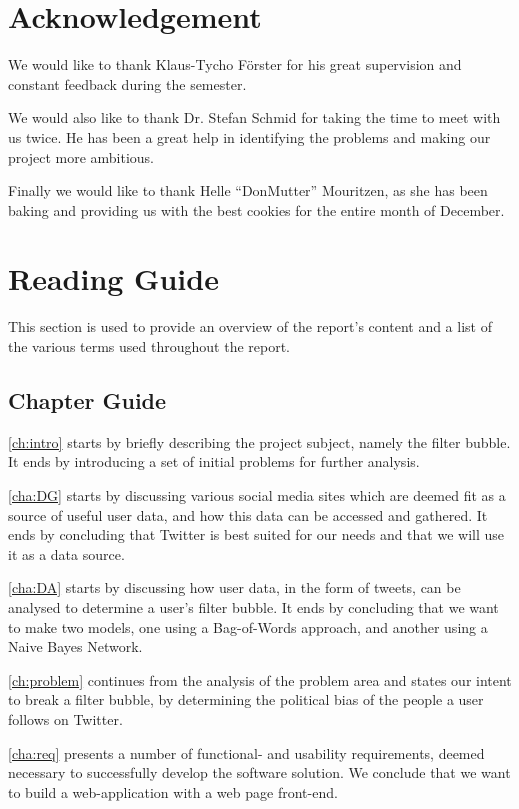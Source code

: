 \section*{Acknowledgement}
We would like to thank Klaus-Tycho Förster for his great supervision
and constant feedback during the semester.\nl

We would also like to thank Dr. Stefan Schmid for taking the time to meet with
us twice. He has been a great help in identifying the problems and making our
project more ambitious.\nl

Finally we would like to thank Helle ``DonMutter'' Mouritzen, as she has been
baking and providing us with the best cookies for the entire month of
December.\newpage


\section{Reading Guide}\label{sec:readingGuide}
This section is used to provide an overview of the report's content and a list
of the various terms used throughout the report.

\subsection{Chapter Guide}
\autoref{ch:intro} starts by briefly describing the project subject, namely  the
filter bubble. It ends by introducing a set of initial problems for further
analysis.\nl

\autoref{cha:DG} starts by discussing various social media sites which are
deemed fit as a source of useful user data, and how this data can be
accessed and gathered. It ends by concluding that Twitter is best suited for our
needs and that we will use it as a data source.\nl

\autoref{cha:DA} starts by discussing how user data, in the form of tweets, can
be analysed to determine a user's filter bubble. It ends by concluding
that we want to make two models, one using a Bag-of-Words approach, and another
using a Naive Bayes Network.\nl

\autoref{ch:problem} continues from the analysis of the problem area and states
our intent to break a filter bubble, by determining the political bias of the
people a user follows on Twitter.\nl

\autoref{cha:req} presents a number of functional- and usability requirements,
deemed necessary to successfully develop the software solution. We conclude that
we want to build a web-application with a web page front-end.\nl

